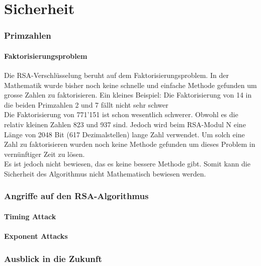 \part{Sicherheit}
\section{Primzahlen}
\subsection{Faktorisierungsproblem}
Die RSA-Verschlüsselung beruht auf dem Faktorisierungsproblem. In der Mathematik wurde bisher noch keine schnelle und einfache Methode gefunden um grosse Zahlen zu faktorisieren. Ein kleines Beispiel:
Die Faktorisierung von 14 in die beiden Primzahlen 2 und 7 fällt nicht sehr schwer\\
Die Faktorisierung von 771'151 ist schon wesentlich schwerer. Obwohl es die relativ kleinen Zahlen 823 und 937 sind. Jedoch wird beim RSA-Modul N eine Länge von 2048 Bit (617 Dezimalstellen) lange Zahl verwendet. Um solch eine Zahl zu faktorisieren wurden noch keine Methode gefunden um dieses Problem in vernünftiger Zeit zu lösen. \\
Es ist jedoch nicht bewiesen, das es keine bessere Methode gibt. Somit kann die Sicherheit des Algorithmus nicht Mathematisch bewiesen werden.



\section{Angriffe auf den RSA-Algorithmus}
\subsection{Timing Attack}
\subsection{Exponent Attacks}
\section{Ausblick in die Zukunft}
